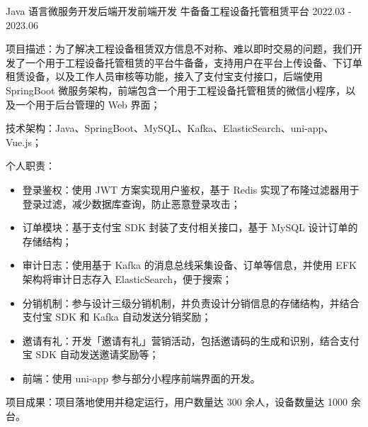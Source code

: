 \begin{cventries}
  \cventry
    {Java 语言微服务开发{\enskip\cdotp\enskip}后端开发{\enskip\cdotp\enskip}前端开发} %
    {牛备备工程设备托管租赁平台} %
    {2022.03 - 2023.06} %
    {} %
    {
      \begin{cvitems}
        \item {项目描述：为了解决工程设备租赁双方信息不对称、难以即时交易的问题，我们开发了一个用于工程设备托管租赁的平台牛备备，支持用户在平台上传设备、下订单租赁设备，以及工作人员审核等功能，接入了支付宝支付接口，后端使用 SpringBoot 微服务架构，前端包含一个用于工程设备托管租赁的微信小程序，以及一个用于后台管理的 Web 界面；}
        \item {技术架构：Java、SpringBoot、MySQL、Kafka、ElasticSearch、uni-app、Vue.js；}
        \item {个人职责：}
          \begin{itemize}
            \item {登录鉴权：使用 JWT 方案实现用户鉴权，基于 Redis 实现了布隆过滤器用于登录过滤，减少数据库查询，防止恶意登录攻击；}
            \item {订单模块：基于支付宝 SDK 封装了支付相关接口，基于 MySQL 设计订单的存储结构；}
            \item {审计日志：使用基于 Kafka 的消息总线采集设备、订单等信息，并使用 EFK 架构将审计日志存入 ElasticSearch，便于搜索；}
            \item {分销机制：参与设计三级分销机制，并负责设计分销信息的存储结构，并结合支付宝 SDK 和 Kafka 自动发送分销奖励；}
            \item {邀请有礼：开发「邀请有礼」营销活动，包括邀请码的生成和识别，结合支付宝 SDK 自动发送邀请奖励等；}
            \item {前端：使用 uni-app 参与部分小程序前端界面的开发。}
          \end{itemize}
        \item {项目成果：项目落地使用并稳定运行，用户数量达 300 余人，设备数量达 1000 余台。}
      \end{cvitems}
    }



\end{cventries}
